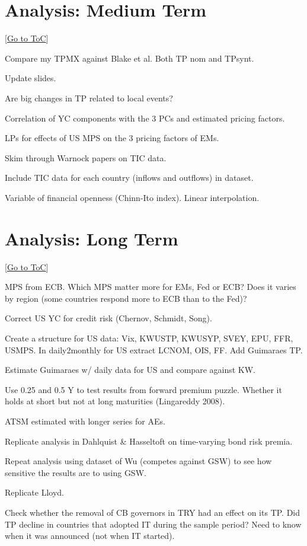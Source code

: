 \documentclass[12pt]{article}
\newcommand{\gototoc}{\vspace{-1.8cm} \null\hfill [\hyperlink{toc}{Go to ToC}] \newline}
\begin{document}
\section{Analysis: Medium Term}
\gototoc
\begin{todolist}
	\item Compare my TPMX against Blake et al. Both TP nom and TPsynt.
	\item Update slides.
	\item Are big changes in TP related to local events?
	\item Correlation of YC components with the 3 PCs and estimated pricing factors.
	\item LPs for effects of US MPS on the 3 pricing factors of EMs.
	\item Skim through Warnock papers on TIC data.
	\item Include TIC data for each country (inflows and outflows) in dataset.
	\item Variable of financial openness (Chinn-Ito index). Linear interpolation.
\end{todolist}

\section{Analysis: Long Term}
\gototoc
\begin{todolist}
	\item MPS from ECB. Which MPS matter more for EMs, Fed or ECB? Does it varies by region (some countries respond more to ECB than to the Fed)?
	\item Correct US YC for credit risk (Chernov, Schmidt, Song).
	\item Create a structure for US data: Vix, KWUSTP, KWUSYP, SVEY, EPU, FFR, USMPS. In daily2monthly for US extract LCNOM, OIS, FF. Add Guimaraes TP.
	\item Estimate Guimaraes w/ daily data for US and compare against KW.
	\item Use 0.25 and 0.5 Y to test results from forward premium puzzle. Whether it holds at short but not at long maturities (Lingareddy 2008).
	\item ATSM estimated with longer series for AEs.
	\item Replicate analysis in Dahlquist \& Hasseltoft on time-varying bond risk premia.
	\item Repeat analysis using dataset of Wu (competes against GSW) to see how sensitive the results are to using GSW.
	\item Replicate Lloyd.
	\item Check whether the removal of CB governors in TRY had an effect on its TP. Did TP decline in countries that adopted IT during the sample period? Need to know when it was announced (not when IT started).
\end{todolist}
\end{document}
